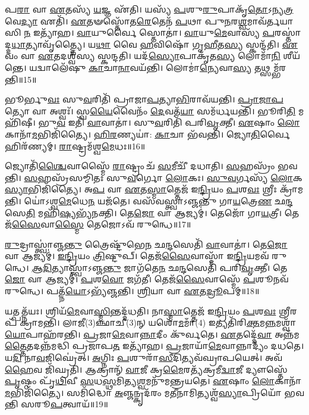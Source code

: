 𑌪\-\ul{𑌰𑌾} 𑌵𑌾 \ul{𑌏}\-𑌤𑌸𑍍𑌯᳴ \ul{𑌯}\-𑌜𑍍𑌞 𑌏᳴𑌤𑌿।
𑌯𑌸𑍍𑌯᳴ \ul{𑌪}\-𑌶𑍁\-\ul{𑌰𑍁}\-𑌪𑌾𑌕𑍃᳴\-\ul{𑌤𑍋}\-\-𑌽𑌨𑍍𑌯\-\ul{𑌤𑍍𑌰} 𑌵𑍇\-\ul{𑌦𑍍𑌯𑌾} 𑌏𑌤𑌿᳴।
\-\ul{𑌏}\-𑌤𑍟𑌸𑍍𑌤𑍋᳴𑌤\-\ul{𑌰𑍇}\-𑌤𑍇𑌨᳴ \ul{𑌪}\-𑌥𑌾 𑌪𑍁\-\ul{𑌨}\-𑌰\-\ul{𑌶𑍍𑌵}\-𑌮𑌾𑌵᳴𑌰𑍍𑌤𑌯𑌾𑌸𑌿 \ul{𑌨} 𑌇𑌤𑍍𑌯𑌾᳴𑌹।
\-\ul{𑌵𑌾}\-𑌯𑍁𑌰𑍍𑌵𑍈 𑌸𑍍𑌤𑍋𑌤𑌾॑।
\-\ul{𑌵𑌾}\-𑌯𑍁\-\ul{𑌮𑍇}\-𑌵𑌾𑌸𑍍𑌯᳴ \ul{𑌪}\-𑌰𑌸𑍍𑌤𑌾॑𑌦𑍍𑌦\-\ul{𑌧𑌾}\-𑌤𑍍𑌯𑌾𑌵𑍃᳴𑌤𑍍𑌤𑍍𑌯𑍈।
𑌯\-\ul{𑌥𑌾} 𑌵𑍈 \ul{𑌹}\-𑌵𑌿𑌷𑍋᳴ 𑌗𑍃\-\ul{𑌹𑍀}\-𑌤\-\ul{𑌸𑍍𑌯} 𑌸𑍍𑌕𑌨𑍍𑌦᳴𑌤𑌿।
\-\ul{𑌏}\-𑌵𑌂 𑌵𑌾 \ul{𑌏}\-𑌤𑌦𑌶𑍍𑌵᳴𑌸𑍍𑌯 𑌸𑍍𑌕𑌨𑍍𑌦𑌤𑌿।
𑌯𑌦᳴\-\ul{𑌸𑍍𑌯𑍋}\-𑌪𑌾𑌕𑍃᳴𑌤\-\ul{𑌸𑍍𑌯} 𑌲𑍋𑌮𑌾᳴\-\ul{𑌨𑌿} 𑌶𑍀𑌯᳴𑌨𑍍𑌤𑍇।
𑌯𑌦𑍍𑌵𑌾𑌲𑍇᳴𑌷𑍁 \ul{𑌕𑌾}\-𑌚𑌾\-\ul{𑌨𑌾}\-𑌵𑌯᳴𑌨𑍍𑌤𑌿।
𑌲𑍋𑌮𑌾॑\-\ul{𑌨𑍍𑌯𑍇}\-𑌵𑌾\-\ul{𑌸𑍍𑌯} 𑌤𑌥𑍍𑌸𑌮𑍍𑌭᳴𑌰𑌨𑍍𑌤𑌿॥15॥

𑌭𑍂𑌰𑍍𑌭𑍁\-\ul{𑌵𑌃} 𑌸𑍁\-\ul{𑌵}\-𑌰𑌿𑌤𑌿᳴ 𑌪𑍍𑌰𑌾𑌜𑌾\-\ul{𑌪}\-𑌤𑍍𑌯𑌾\-\ul{𑌭𑌿}\-𑌰𑌾𑌵᳴𑌯𑌨𑍍𑌤𑌿।
\-\ul{𑌪𑍍𑌰𑌾}\-\-\ul{𑌜𑌾}\-\-\ul{𑌪}\-𑌤𑍍𑌯𑍋 𑌵𑌾 𑌅𑌶𑍍𑌵𑌃᳴।
𑌸𑍍𑌵\-\ul{𑌯𑍈}\-𑌵𑍈𑌨𑌂᳴ \ul{𑌦𑍇}\-𑌵𑌤᳴\-\ul{𑌯𑌾} 𑌸𑌮᳴𑌰𑍍𑌧𑌯𑌨𑍍𑌤𑌿।
𑌭𑍂𑌰𑌿\-\ul{𑌤𑌿} 𑌮𑌹𑌿᳴𑌷𑍀।
𑌭𑍁\-\ul{𑌵} 𑌇𑌤𑌿᳴ \ul{𑌵𑌾}\-𑌵𑌾𑌤𑌾॑।
𑌸𑍁\-\ul{𑌵}\-𑌰𑌿𑌤𑌿᳴ 𑌪𑌰𑌿\-\ul{𑌵𑍃}\-𑌕𑍍𑌤𑍀।
\-\ul{𑌏}\-𑌷𑌾𑌂 \ul{𑌲𑍋}\-𑌕𑌾𑌨𑌾᳴\-\ul{𑌮}\-𑌭𑌿𑌜𑌿᳴𑌤𑍍𑌯𑍈।
\-\ul{𑌹𑌿}\-\-\ul{𑌰}\-𑌣𑍍𑌯𑌯𑌾॑: \ul{𑌕𑌾}\-𑌚𑌾 𑌭᳴𑌵𑌨𑍍𑌤𑌿।
𑌜𑍍𑌯𑍋\-\ul{𑌤𑌿}\-𑌰𑍍𑌵𑍈 𑌹𑌿𑌰᳴𑌣𑍍𑌯𑌮𑍍।
\-\ul{𑌰𑌾}\-𑌷𑍍𑌟𑍍𑌰𑌮᳴𑌶𑍍𑌵\-\ul{𑌮𑍇}\-𑌧𑌃॥16॥

𑌜𑍍𑌯𑍋𑌤𑌿᳴\-\ul{𑌶𑍍𑌚𑍈}\-𑌵𑌾𑌸𑍍𑌮𑍈᳴ \ul{𑌰𑌾}\-𑌷𑍍𑌟𑍍𑌰𑌂 𑌚᳴ \ul{𑌸}\-𑌮𑍀𑌚𑍀᳴ 𑌦𑌧𑌾𑌤𑌿।
\-\ul{𑌸}\-𑌹𑌸𑍍𑌰𑌂᳴ 𑌭𑌵𑌨𑍍𑌤𑌿।
\-\ul{𑌸}\-𑌹𑌸𑍍𑌰᳴𑌸𑌮𑍍𑌮𑌿𑌤𑌃 𑌸𑍁\-\ul{𑌵}\-𑌰𑍍𑌗𑍋 \ul{𑌲𑍋}\-𑌕𑌃।
\-\ul{𑌸𑍁}\-\-\ul{𑌵}\-𑌰𑍍𑌗𑌸𑍍𑌯᳴ \ul{𑌲𑍋}\-𑌕\-\ul{𑌸𑍍𑌯𑌾}\-𑌭𑌿𑌜𑌿᳴𑌤𑍍𑌯𑍈।
𑌅\-\ul{𑌪} 𑌵𑌾 \ul{𑌏}\-𑌤\-\ul{𑌸𑍍𑌮𑌾}\-𑌤𑍍𑌤𑍇𑌜᳴ 𑌇\-\ul{𑌨𑍍𑌦𑍍𑌰𑌿}\-𑌯𑌂 \ul{𑌪}\-𑌶\-\ul{𑌵𑌃} 𑌶𑍍𑌰𑍀𑌃 𑌕𑍍𑌰𑌾᳴𑌮𑌨𑍍𑌤𑌿।
𑌯𑍋॑𑌽𑌶𑍍𑌵\-\ul{𑌮𑍇}\-𑌧𑍇\-\ul{𑌨} 𑌯𑌜᳴𑌤𑍇।
𑌵𑌸᳴𑌵𑌸𑍍𑌤𑍍𑌵𑌾\-𑌽𑌞𑍍𑌜𑌨𑍍𑌤𑍁 𑌗𑌾\-\ul{𑌯}\-𑌤𑍍𑌰𑍇\-\ul{𑌣} 𑌛\-\ul{𑌨𑍍𑌦}\-𑌸𑍇\-\ul{𑌤𑌿} 𑌮𑌹𑌿᳴\-\ul{𑌷𑍍𑌯}\-𑌭𑍍𑌯᳴𑌨𑌕𑍍𑌤𑌿।
𑌤𑍇\-\ul{𑌜𑍋} 𑌵𑌾 𑌆𑌜𑍍𑌯𑌮𑍍॑।
𑌤𑍇𑌜𑍋᳴ 𑌗𑌾\-\ul{𑌯}\-𑌤𑍍𑌰𑍀।
𑌤𑍇𑌜᳴\-\ul{𑌸𑍈}\-𑌵𑌾\-\ul{𑌸𑍍𑌮𑍈} 𑌤𑍇𑌜𑍋\-𑌽𑌵᳴ 𑌰𑍁𑌨𑍍𑌧𑍇॥17॥

\-\ul{𑌰𑍁}\-𑌦𑍍𑌰𑌾𑌸𑍍𑌤𑍍𑌵𑌾॑𑌞𑍍𑌜\-\ul{𑌨𑍍𑌤𑍁} 𑌤𑍍𑌰𑍈𑌷𑍍𑌟𑍁᳴𑌭𑍇\-\ul{𑌨} 𑌛\-\ul{𑌨𑍍𑌦}\-𑌸𑍇𑌤𑌿᳴ \ul{𑌵𑌾}\-𑌵𑌾𑌤𑌾॑।
𑌤𑍇\-\ul{𑌜𑍋} 𑌵𑌾 𑌆𑌜𑍍𑌯𑌮𑍍॑।
\-\ul{𑌇}\-\-\ul{𑌨𑍍𑌦𑍍𑌰𑌿}\-𑌯𑌂 \ul{𑌤𑍍𑌰𑌿}\-𑌷𑍍𑌟𑍁𑌪𑍍।
𑌤𑍇𑌜᳴\-\ul{𑌸𑍈}\-𑌵𑌾𑌸𑍍𑌮𑌾᳴ 𑌇\-\ul{𑌨𑍍𑌦𑍍𑌰𑌿}\-𑌯𑌮𑌵᳴ 𑌰𑍁𑌨𑍍𑌧𑍇।
\-\ul{𑌆}\-\-\ul{𑌦𑌿}\-𑌤𑍍𑌯𑌾𑌸𑍍𑌤𑍍𑌵𑌾॑\-𑌽𑌞𑍍𑌜\-\ul{𑌨𑍍𑌤𑍁} 𑌜𑌾𑌗᳴𑌤𑍇\-\ul{𑌨} 𑌛\-\ul{𑌨𑍍𑌦}\-𑌸𑍇𑌤𑌿᳴ 𑌪𑌰𑌿\-\ul{𑌵𑍃}\-𑌕𑍍𑌤𑍀।
𑌤𑍇\-\ul{𑌜𑍋} 𑌵𑌾 𑌆𑌜𑍍𑌯𑌮𑍍॑।
\-\ul{𑌪}\-𑌶\-\ul{𑌵𑍋} 𑌜𑌗᳴𑌤𑍀।
𑌤𑍇𑌜᳴\-\ul{𑌸𑍈}\-𑌵𑌾𑌸𑍍𑌮𑍇᳴ \ul{𑌪}\-𑌶𑍂𑌨𑌵᳴ 𑌰𑍁𑌨𑍍𑌧𑍇।
𑌪𑌤𑍍𑌨᳴\-\ul{𑌯𑍋}\-\-𑌽𑌭𑍍𑌯᳴𑌞𑍍𑌜𑌨𑍍𑌤𑌿।
\-\ul{𑌶𑍍𑌰𑌿}\-𑌯𑌾 𑌵𑌾 \ul{𑌏}\-𑌤\-\ul{𑌦𑍍𑌰𑍂}\-𑌪𑌮𑍍॥18॥

𑌯𑌤𑍍𑌪𑌤𑍍𑌨᳴𑌯𑌃।
𑌶𑍍𑌰𑌿𑌯᳴\-\ul{𑌮𑍇}\-𑌵𑌾\-\ul{𑌸𑍍𑌮𑌿}\-𑌨𑍍𑌤𑌦𑍍𑌦᳴𑌧𑌤𑌿।
𑌨𑌾\-\ul{𑌸𑍍𑌮𑌾}\-𑌤𑍍𑌤𑍇𑌜᳴ 𑌇\-\ul{𑌨𑍍𑌦𑍍𑌰𑌿}\-𑌯𑌂 \ul{𑌪}\-𑌶\-\ul{𑌵𑌃} 𑌶𑍍𑌰𑍀𑌰𑌪᳴ 𑌕𑍍𑌰𑌾𑌮𑌨𑍍𑌤𑌿।
𑌲𑌾𑌜𑍀(3)𑌞𑍍𑌛𑌾𑌚𑍀(3)𑌨𑍍 𑌯𑌶𑍋᳴\-\ul{𑌮}\-𑌮𑌾𑌁(4) 𑌇𑌤𑍍𑌯𑌤𑌿᳴𑌰𑌿\-\ul{𑌕𑍍𑌤}\-𑌮\-\ul{𑌨𑍍𑌨}\-𑌮𑌶𑍍𑌵𑌾᳴\-\ul{𑌯𑍋}\-𑌪𑌾𑌹᳴𑌰𑌨𑍍𑌤𑌿।
\-\ul{𑌪𑍍𑌰}\-𑌜𑌾\-\ul{𑌮𑍇}\-𑌵𑌾\-\ul{𑌨𑍍𑌨𑌾}\-𑌦𑍀𑌂 𑌕𑍁᳴𑌰𑍍𑌵𑌤𑍇।
\-\ul{𑌏}\-𑌤𑌦𑍍𑌦𑍇᳴\-\ul{𑌵𑌾} 𑌅𑌨𑍍𑌨᳴𑌮\-\ul{𑌤𑍍𑌤𑍈}\-𑌤𑌦𑌨𑍍𑌨᳴𑌮𑌦𑍍𑌧𑌿 𑌪𑍍𑌰𑌜𑌾𑌪\-\ul{𑌤} 𑌇𑌤𑍍𑌯𑌾᳴𑌹।
\-\ul{𑌪𑍍𑌰}\-𑌜𑌾𑌯𑌾᳴\-\ul{𑌮𑍇}\-𑌵𑌾𑌨𑍍𑌨𑌾𑌦𑍍𑌯𑌂᳴ 𑌦𑌧𑌤𑍇।
𑌯\-\ul{𑌦𑌿} 𑌨𑌾\-\ul{𑌵}\-𑌜𑌿𑌘𑍍𑌰𑍇॑𑌤𑍍।
\-\ul{𑌅}\-𑌗𑍍𑌨𑌿𑌃 \ul{𑌪}\-𑌶𑍁𑌰𑌾᳴\-\ul{𑌸𑍀}\-𑌦𑌿𑌤𑍍𑌯𑌵᳴𑌘𑍍𑌰𑌾𑌪𑌯𑍇𑌤𑍍।
𑌅𑌵᳴ \ul{𑌹𑍈}\-𑌵 𑌜𑌿᳴𑌘𑍍𑌰𑌤𑌿।
𑌆𑌕𑍍𑌰𑌾𑌨𑍍᳴ \ul{𑌵𑌾}\-𑌜𑍀 𑌕𑍍𑌰\-\ul{𑌮𑍈}\-𑌰𑌤𑍍𑌯᳴𑌕𑍍𑌰𑌮𑍀\-\ul{𑌦𑍍𑌵𑌾}\-𑌜𑍀 𑌦𑍍𑌯𑍗𑌸𑍍𑌤𑍇᳴ \ul{𑌪𑍃}\-𑌷𑍍𑌠𑌂 𑌪𑍃᳴\-\ul{𑌥𑌿}\-𑌵𑍀 \ul{𑌸}\-𑌧\-\ul{𑌸𑍍𑌥}\-𑌮𑌿𑌤𑍍𑌯\-\ul{𑌶𑍍𑌵}\-𑌮𑌨𑍁᳴𑌮𑌨𑍍𑌤𑍍𑌰𑌯𑌤𑍇।
\-\ul{𑌏}\-𑌷𑌾𑌂 \ul{𑌲𑍋}\-𑌕𑌾𑌨𑌾᳴\-\ul{𑌮}\-𑌭𑌿𑌜𑌿᳴𑌤𑍍𑌯𑍈।
𑌸𑌮𑌿᳴𑌦𑍍𑌧𑍋 \ul{𑌅}\-𑌞𑍍𑌜𑌨𑍍𑌕𑍃𑌦᳴𑌰𑌂 𑌮\-\ul{𑌤𑍀}\-𑌨𑌾𑌮𑌿𑌤𑍍𑌯𑌶𑍍𑌵᳴\-\ul{𑌸𑍍𑌯𑌾}\-𑌪𑍍𑌰𑌿𑌯𑍋᳴ 𑌭𑌵𑌨𑍍𑌤𑌿 𑌸𑌰𑍂\-\ul{𑌪}\-𑌤𑍍𑌵𑌾𑌯᳴॥19॥\anuvakamend[𑌪𑌰𑌿᳴\-\ul{𑌤}\-𑌸𑍍𑌥𑍁\-\ul{𑌷} 𑌇𑌤𑍍𑌯𑌾᳴\-\ul{𑌹𑍇}\-𑌮𑍇 \ul{𑌏}\-𑌵𑌾𑌸𑍍𑌮𑍈᳴ 𑌯𑍁𑌨\-\ul{𑌕𑍍𑌤𑍍𑌯}\-𑌭𑌿𑌜𑌿᳴𑌤𑍍𑌯𑍈 𑌭𑌰𑌨𑍍𑌤𑍍𑌯𑌶𑍍𑌵\-\ul{𑌮𑍇}\-𑌧𑍋 𑌰𑍁᳴𑌨𑍍𑌧𑍇 \ul{𑌰𑍂}\-𑌪𑌞𑍍𑌜𑌿᳴𑌘𑍍𑌰\-\ul{𑌤𑌿} 𑌤𑍍𑌰𑍀𑌣𑌿᳴ 𑌚]

